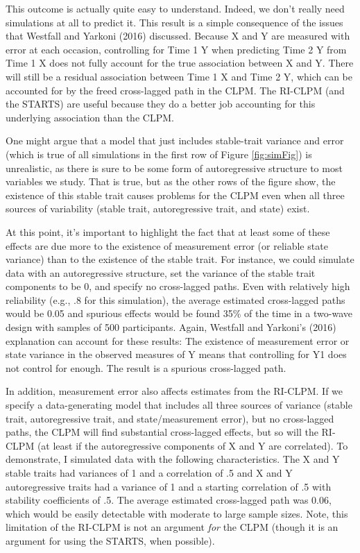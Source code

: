 \documentclass[
  english,
  man,floatsintext]{apa6}
\begin{document}
This outcome is actually quite easy to understand. Indeed, we don't really need simulations at all to predict it. This result is a simple consequence of the issues that Westfall and Yarkoni (2016) discussed. Because X and Y are measured with error at each occasion, controlling for Time 1 Y when predicting Time 2 Y from Time 1 X does not fully account for the true association between X and Y. There will still be a residual association between Time 1 X and Time 2 Y, which can be accounted for by the freed cross-lagged path in the CLPM. The RI-CLPM (and the STARTS) are useful because they do a better job accounting for this underlying association than the CLPM.

One might argue that a model that just includes stable-trait variance and error (which is true of all simulations in the first row of Figure \ref{fig:simFig}) is unrealistic, as there is sure to be some form of autoregressive structure to most variables we study. That is true, but as the other rows of the figure show, the existence of this stable trait causes problems for the CLPM even when all three sources of variability (stable trait, autoregressive trait, and state) exist.

At this point, it's important to highlight the fact that at least some of these effects are due more to the existence of measurement error (or reliable state variance) than to the existence of the stable trait. For instance, we could simulate data with an autoregressive structure, set the variance of the stable trait components to be 0, and specify no cross-lagged paths. Even with relatively high reliability (e.g., .8 for this simulation), the average estimated cross-lagged paths would be 0.05 and spurious effects would be found 35\% of the time in a two-wave design with samples of 500 participants. Again, Westfall and Yarkoni's (2016) explanation can account for these results: The existence of measurement error or state variance in the observed measures of Y means that controlling for Y1 does not control for enough. The result is a spurious cross-lagged path.

In addition, measurement error also affects estimates from the RI-CLPM. If we specify a data-generating model that includes all three sources of variance (stable trait, autoregressive trait, and state/measurement error), but no cross-lagged paths, the CLPM will find substantial cross-lagged effects, but so will the RI-CLPM (at least if the autoregressive components of X and Y are correlated). To demonstrate, I simulated data with the following characteristics. The X and Y stable traits had variances of 1 and a correlation of .5 and X and Y autoregressive traits had a variance of 1 and a starting correlation of .5 with stability coefficients of .5. The average estimated cross-lagged path was 0.06, which would be easily detectable with moderate to large sample sizes. Note, this limitation of the RI-CLPM is not an argument \emph{for} the CLPM (though it is an argument for using the STARTS, when possible).
\end{document}
